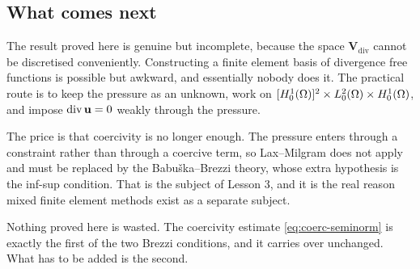 \documentclass[11pt,a4paper]{article}
\begin{document}
\subsection{What comes next}

The result proved here is genuine but incomplete, because the space
$\mathbf{V}_{\mathrm{div}}$ cannot be discretised conveniently. Constructing a
finite element basis of divergence free functions is possible but awkward, and
essentially nobody does it. The practical route is to keep the pressure as an
unknown, work on $[H^{1}_{0}(\Omega)]^{2} \times L^{2}_{0}(\Omega) \times H^{1}_{0}(\Omega)$, and impose
$\operatorname{div} \mathbf{u} = 0$ weakly through the pressure.

The price is that coercivity is no longer enough. The pressure enters through a
constraint rather than through a coercive term, so Lax--Milgram does not apply
and must be replaced by the Babu\v{s}ka--Brezzi theory, whose extra hypothesis
is the inf-sup condition. That is the subject of Lesson 3, and it is the real
reason mixed finite element methods exist as a separate subject.

Nothing proved here is wasted. The coercivity estimate \eqref{eq:coerc-seminorm}
is exactly the first of the two Brezzi conditions, and it carries over unchanged.
What has to be added is the second.
\end{document}
